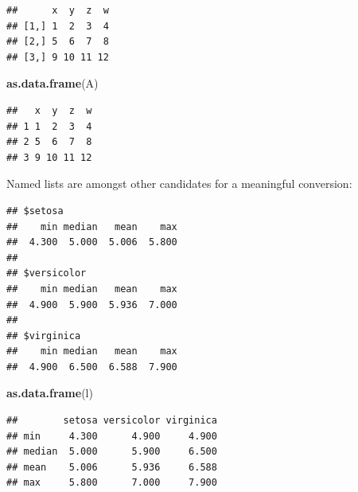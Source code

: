 \documentclass[10pt,b5paper,krantz1]{krantz}
\newenvironment{Shaded}{\begin{snugshade}}{\end{snugshade}}
\newcommand{\ControlFlowTok}[1]{\textcolor[rgb]{0.27,0.27,0.27}{\textbf{#1}}}
\newcommand{\DataTypeTok}[1]{\textcolor[rgb]{0.27,0.27,0.27}{#1}}
\newcommand{\KeywordTok}[1]{\textcolor[rgb]{0.27,0.27,0.27}{\textbf{#1}}}
\newcommand{\NormalTok}[1]{#1}
\newcommand{\OperatorTok}[1]{\textcolor[rgb]{0.43,0.43,0.43}{\textbf{#1}}}
\newcommand{\StringTok}[1]{\textcolor[rgb]{0.5,0.5,0.5}{#1}}
\begin{document}
\begin{verbatim}
##      x  y  z  w
## [1,] 1  2  3  4
## [2,] 5  6  7  8
## [3,] 9 10 11 12
\end{verbatim}

\begin{Shaded}
\begin{Highlighting}[]
\KeywordTok{as.data.frame}\NormalTok{(A)}
\end{Highlighting}
\end{Shaded}

\begin{verbatim}
##   x  y  z  w
## 1 1  2  3  4
## 2 5  6  7  8
## 3 9 10 11 12
\end{verbatim}

Named lists are amongst other candidates for a meaningful conversion:

\begin{Shaded}
\end{Shaded}

\begin{verbatim}
## $setosa
##    min median   mean    max 
##  4.300  5.000  5.006  5.800 
## 
## $versicolor
##    min median   mean    max 
##  4.900  5.900  5.936  7.000 
## 
## $virginica
##    min median   mean    max 
##  4.900  6.500  6.588  7.900
\end{verbatim}

\begin{Shaded}
\begin{Highlighting}[]
\KeywordTok{as.data.frame}\NormalTok{(l)}
\end{Highlighting}
\end{Shaded}

\begin{verbatim}
##        setosa versicolor virginica
## min     4.300      4.900     4.900
## median  5.000      5.900     6.500
## mean    5.006      5.936     6.588
## max     5.800      7.000     7.900
\end{verbatim}
\end{document}
